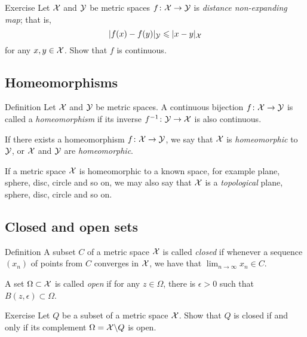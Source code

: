 \begin{thm}{Exercise}\label{ex:shrt=>continuous}
Let ${\mathcal{X}}$ and $\mathcal{Y}$ be metric spaces $f\colon\mathcal{X}\to \mathcal{Y}$ is \emph{distance non-expanding map}; that is, 
\[\dist{f(x)}{f(y)}{\spc{Y}}\le \dist{x}{y}{\spc{X}}\]
for any $x,y\in \mathcal{X}$.
Show that $f$ is continuous.
\end{thm}

\subsection*{Homeomorphisms}

\begin{thm}{Definition}
Let $\mathcal{X}$ and $\mathcal{Y}$ be metric spaces.
A continuous bijection $f\colon\mathcal{X}\to \mathcal{Y}$ 
is called a \emph{homeomorphism} 
if its inverse $f^{-1}\:\spc{Y}\z\to \spc{X}$ is also continuous.

If there exists a homeomorphism $f\colon\mathcal{X}\to \mathcal{Y}$,
we say that ${\mathcal{X}}$ is {}\emph{homeomorphic} to $\mathcal{Y}$,
or  $\mathcal{X}$ and $\mathcal{Y}$ are {}\emph{homeomorphic}.
\end{thm}

If a metric space $\mathcal{X}$ is homeomorphic to a known space, for example plane, sphere, disc, circle and so on,
we may also say that $\mathcal{X}$ is a \emph{topological} plane, sphere, disc, circle and so on.

\subsection*{Closed and open sets}

\begin{thm}{Definition}
A subset $C$ of a metric space $\mathcal{X}$ is called \emph{closed} if whenever a sequence $(x_n)$ of points from $C$ converges in $\mathcal{X}$, we have that $\lim_{n\to\infty} x_n \in C$.

A set $\Omega \subset \mathcal{X}$ is called \emph{open} if for any $z\in \Omega$, 
there is $\epsilon>0$ such that $B(z,\epsilon)\subset\Omega$.
\end{thm}

\begin{thm}{Exercise}\label{ex:close-open}
Let $Q$ be a subset of a metric space $\mathcal{X}$.
Show that $Q$ is closed if and only if its complement $\Omega=\mathcal{X}\backslash Q$ is open.
\end{thm}

